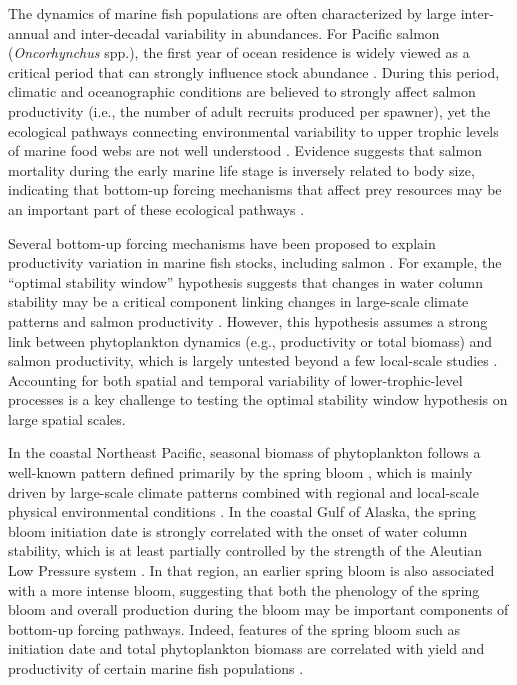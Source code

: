 The dynamics of marine fish populations are often characterized by large
inter-annual and inter-decadal variability in abundances. For Pacific salmon
(\emph{Oncorhynchus} spp.), the first year of ocean residence is widely viewed
as a critical period that can strongly influence stock abundance
\citep{Peterman1985a, Parker1968a, Wertheimer2007a}. During this period,
climatic and oceanographic conditions are believed to strongly affect salmon
productivity (i.e., the number of adult recruits produced per spawner), yet the
ecological pathways connecting environmental variability to upper trophic levels
of marine food webs are not well understood \citep{Drinkwater2010a,
Ottersen2010a}. Evidence suggests that salmon mortality during the early marine
life stage is inversely related to body size, indicating that bottom-up forcing
mechanisms that affect prey resources may be an important part of these
ecological pathways \citep{McGurk1996a, Duffy2011, Farley2007b}.

Several bottom-up forcing mechanisms have been proposed to explain productivity
variation in marine fish stocks, including salmon \citep{Cushing1990a,
Gargett1997a}. For example, the ``optimal stability window'' hypothesis suggests
that changes in water column stability may be a critical component linking
changes in large-scale climate patterns and salmon productivity
\citep{Gargett1997a}. However, this hypothesis assumes a strong link between
phytoplankton dynamics (e.g., productivity or total biomass) and salmon
productivity, which is largely untested beyond a few local-scale studies
\citep{Mathews1989a, Chittenden2010a}.  Accounting for both spatial and temporal
variability of lower-trophic-level processes is a key challenge to testing the
optimal stability window hypothesis on large spatial scales.

In the coastal Northeast Pacific, seasonal biomass of phytoplankton follows a
well-known pattern defined primarily by the spring bloom \citep{Henson2007a,
Waite2013}, which is mainly driven by large-scale climate patterns combined with
regional and local-scale physical environmental conditions \citep{Sverdrup1953a,
Ware1991a, Polovina1995a, Henson2007a}. In the coastal Gulf of Alaska, the
spring bloom initiation date is strongly correlated with the onset of water
column stability, which is at least partially controlled by the strength of the
Aleutian Low Pressure system \citep{Henson2007a}. In that region, an earlier
spring bloom is also associated with a more intense bloom, suggesting that both
the phenology of the spring bloom and overall production during the bloom may be
important components of bottom-up forcing pathways. Indeed, features of the
spring bloom such as initiation date and total phytoplankton biomass are
correlated with yield and productivity of certain marine fish populations
\citep{Platt2003a, Ware2005a, Koeller2009}.

